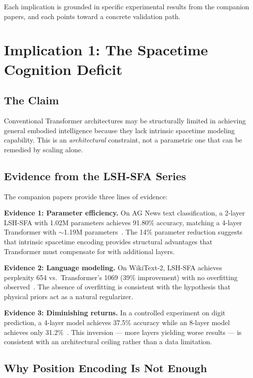 \documentclass{article}
\begin{document}
Each implication is grounded in specific experimental results from the companion papers, and each points toward a concrete validation path.

\section{Implication 1: The Spacetime Cognition Deficit}

\subsection{The Claim}

Conventional Transformer architectures may be structurally limited in achieving general embodied intelligence because they lack intrinsic spacetime modeling capability. This is an \textit{architectural} constraint, not a parametric one that can be remedied by scaling alone.

\subsection{Evidence from the LSH-SFA Series}

The companion papers provide three lines of evidence:

\textbf{Evidence 1: Parameter efficiency.} On AG News text classification, a 2-layer LSH-SFA with 1.02M parameters achieves 91.80\% accuracy, matching a 4-layer Transformer with $\sim$1.19M parameters~\citep{lsh-sfa}. The 14\% parameter reduction suggests that intrinsic spacetime encoding provides structural advantages that Transformer must compensate for with additional layers.

\textbf{Evidence 2: Language modeling.} On WikiText-2, LSH-SFA achieves perplexity 654 vs.\ Transformer's 1069 (39\% improvement) with no overfitting observed~\citep{lsh-sfa}. The absence of overfitting is consistent with the hypothesis that physical priors act as a natural regularizer.

\textbf{Evidence 3: Diminishing returns.} In a controlled experiment on digit prediction, a 4-layer model achieves 37.5\% accuracy while an 8-layer model achieves only 31.2\%~\citep{lsh-encoding-gradient}. This inversion --- more layers yielding worse results --- is consistent with an architectural ceiling rather than a data limitation.

\subsection{Why Position Encoding Is Not Enough}
\end{document}
